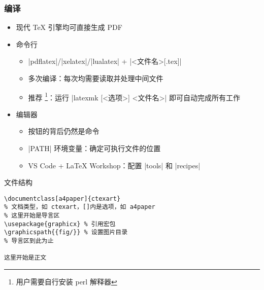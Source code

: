 \begin{frame}[fragile]
  \frametitle{编译}
  \begin{itemize}
    \item 现代 \TeX{} 引擎均可直接生成 PDF
    \item 命令行

      \begin{itemize}
        \item |pdflatex|/|xelatex|/|lualatex| + |<文件名>[.tex]|
        \item 多次编译：每次均需要读取并处理中间文件
        \item 推荐 \footnote{\MiKTeX 用户需要自行安装 perl 解释器}：运行 |latexmk [<选项>] <文件名>| 即可自动完成所有工作
      \end{itemize}

    \item 编辑器

      \begin{itemize}
        \item 按钮的背后仍然是命令
        \item |PATH| 环境变量：确定可执行文件的位置
        \item VS Code + \LaTeX{} Workshop：配置 |tools| 和 |recipes|
      \end{itemize}
  \end{itemize}
\end{frame}


\begin{frame}[fragile]{文件结构}
  \lstset{language=[LaTeX]TeX}
  \begin{lstlisting}[basicstyle=\ttfamily]
\documentclass[a4paper]{ctexart}
% 文档类型，如 ctexart，[]内是选项，如 a4paper
% 这里开始是导言区
\usepackage{graphicx} % 引用宏包
\graphicspath{{fig/}} % 设置图片目录
% 导言区到此为止

这里开始是正文

  \end{lstlisting}
\end{frame}

